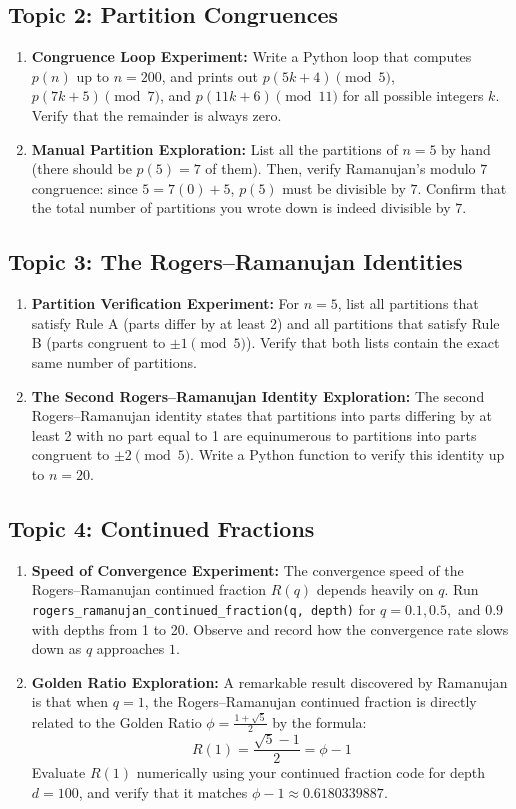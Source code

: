 \documentclass[11pt]{article}
\begin{document}
\subsection{Topic 2: Partition Congruences}
\begin{enumerate}
    \item \textbf{Congruence Loop Experiment:} Write a Python loop that computes $p(n)$ up to $n=200$, and prints out $p(5k+4) \pmod 5$, $p(7k+5) \pmod 7$, and $p(11k+6) \pmod{11}$ for all possible integers $k$. Verify that the remainder is always zero.
    \item \textbf{Manual Partition Exploration:} List all the partitions of $n=5$ by hand (there should be $p(5)=7$ of them). Then, verify Ramanujan's modulo $7$ congruence: since $5 = 7(0) + 5$, $p(5)$ must be divisible by $7$. Confirm that the total number of partitions you wrote down is indeed divisible by $7$.
\end{enumerate}

\subsection{Topic 3: The Rogers--Ramanujan Identities}
\begin{enumerate}
    \item \textbf{Partition Verification Experiment:} For $n=5$, list all partitions that satisfy Rule A (parts differ by at least 2) and all partitions that satisfy Rule B (parts congruent to $\pm 1 \pmod 5$). Verify that both lists contain the exact same number of partitions.
    \item \textbf{The Second Rogers--Ramanujan Identity Exploration:} The second Rogers--Ramanujan identity states that partitions into parts differing by at least 2 with no part equal to 1 are equinumerous to partitions into parts congruent to $\pm 2 \pmod 5$. Write a Python function to verify this identity up to $n=20$.
\end{enumerate}

\subsection{Topic 4: Continued Fractions}
\begin{enumerate}
    \item \textbf{Speed of Convergence Experiment:} The convergence speed of the Rogers--Ramanujan continued fraction $R(q)$ depends heavily on $q$. Run \texttt{rogers\_ramanujan\_continued\_fraction(q, depth)} for $q=0.1, 0.5,$ and $0.9$ with depths from 1 to 20. Observe and record how the convergence rate slows down as $q$ approaches $1$.
    \item \textbf{Golden Ratio Exploration:} A remarkable result discovered by Ramanujan is that when $q=1$, the Rogers--Ramanujan continued fraction is directly related to the Golden Ratio $\phi = \frac{1+\sqrt{5}}{2}$ by the formula:
    \[
    R(1) = \frac{\sqrt{5}-1}{2} = \phi - 1
    \]
    Evaluate $R(1)$ numerically using your continued fraction code for depth $d=100$, and verify that it matches $\phi - 1 \approx 0.6180339887$.
\end{enumerate}
\end{document}
